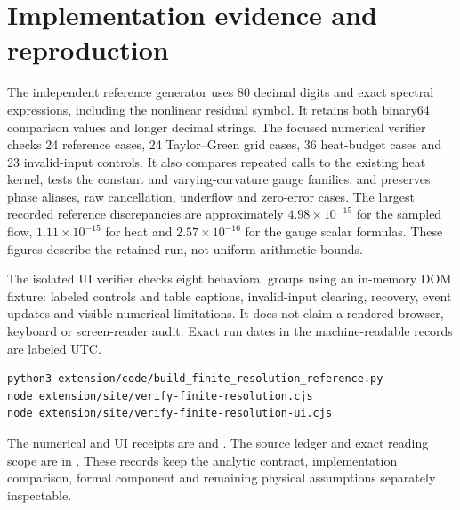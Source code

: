 \section{Implementation evidence and reproduction}

The independent reference generator uses 80 decimal digits and exact
spectral expressions, including the nonlinear residual symbol. It
retains both binary64 comparison values and longer decimal strings.
The focused numerical verifier checks 24 reference cases,
24 Taylor--Green grid cases, 36 heat-budget cases and 23 invalid-input
controls. It also compares repeated calls to the existing heat kernel,
tests the constant and varying-curvature gauge families, and preserves
phase aliases, raw cancellation, underflow and zero-error cases.
The largest recorded reference discrepancies are approximately
$4.98\times10^{-15}$ for the sampled flow,
$1.11\times10^{-15}$ for heat and
$2.57\times10^{-16}$ for the gauge scalar formulas.
These figures describe the retained run, not uniform arithmetic bounds.

The isolated UI verifier checks eight behavioral groups using an
in-memory DOM fixture: labeled controls and table captions, invalid-input
clearing, recovery, event updates and visible numerical limitations.
It does not claim a rendered-browser, keyboard or screen-reader audit.
Exact run dates in the machine-readable records are labeled UTC.

\begin{lstlisting}
python3 extension/code/build_finite_resolution_reference.py
node extension/site/verify-finite-resolution.cjs
node extension/site/verify-finite-resolution-ui.cjs
\end{lstlisting}

The numerical and UI receipts are
 and
.
The source ledger and exact reading scope are in
.
These records keep the analytic contract, implementation comparison,
formal component and remaining physical assumptions separately inspectable.
